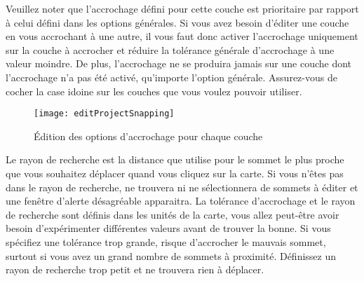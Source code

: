 
Veuillez noter que l'accrochage défini pour cette couche est prioritaire par 
rapport à celui défini dans les options générales. Si vous avez besoin d'éditer 
une couche en vous accrochant à une autre, il vous faut donc activer l'accrochage 
uniquement sur la couche à accrocher et réduire la tolérance générale d'accrochage 
à une valeur moindre. De plus, l'accrochage ne se produira jamais sur une couche 
dont l'accrochage n'a pas été activé, qu'importe l'option générale. Assurez-vous 
de cocher la case idoine sur les couches que vous voulez pouvoir utiliser.

\begin{figure}[H]
  \begin{center}
  \texttt{[image: editProjectSnapping]}
  \caption{Édition des options d'accrochage pour chaque couche \nixcaption}
  \label{fig:snappingoptions}
\end{center}
\end{figure}


Le rayon de recherche est la distance que \qg utilise pour  
le sommet le plus proche que vous souhaitez déplacer quand vous cliquez sur la 
carte. Si vous n'êtes pas dans le rayon de recherche, \qg ne trouvera ni ne 
sélectionnera de sommets à éditer et une fenêtre d'alerte désagréable apparaitra. 
La tolérance d'accrochage et le rayon de recherche sont définis dans les unités 
de la carte, vous allez peut-être avoir besoin d'expérimenter différentes valeurs 
avant de trouver la bonne. Si vous spécifiez une tolérance trop grande, \qg 
risque d'accrocher le mauvais sommet, surtout si vous avez un grand nombre de 
sommets à proximité. Définissez un rayon de recherche trop petit et \qg ne 
trouvera rien à déplacer.

